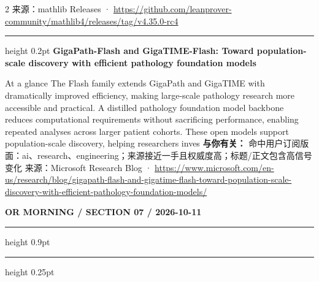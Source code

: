 \documentclass[10.5pt]{ctexart}
\begin{document}
\begin{multicols}{2}
{\footnotesize\color{ormuted} 来源：mathlib Releases · \url{https://github.com/leanprover-community/mathlib4/releases/tag/v4.35.0-rc4}}
\vspace{2mm}
\hrule height 0.2pt
\vspace{2mm}
{\large\bfseries GigaPath-Flash and GigaTIME-Flash: Toward population-scale discovery with efficient pathology foundation models}\par
At a glance The Flash family extends GigaPath and GigaTIME with dramatically improved efficiency, making large-scale pathology research more accessible and practical. A distilled pathology foundation model backbone reduces computational requirements without sacrificing performance, enabling repeated analyses across larger patient cohorts. These open models support population-scale discovery, helping researchers inves
\textbf{与你有关：} 命中用户订阅版面：ai、research、engineering；来源接近一手且权威度高；标题/正文包含高信号变化
{\footnotesize\color{ormuted} 来源：Microsoft Research Blog · \url{https://www.microsoft.com/en-us/research/blog/gigapath-flash-and-gigatime-flash-toward-population-scale-discovery-with-efficient-pathology-foundation-models/}}
\end{multicols}
\newpage
{\small\bfseries OR MORNING / SECTION 07 / 2026-10-11}
\vspace{2mm}
\hrule height 0.9pt
\vspace{1.5mm}
\hrule height 0.25pt
\vspace{4mm}
\end{document}

